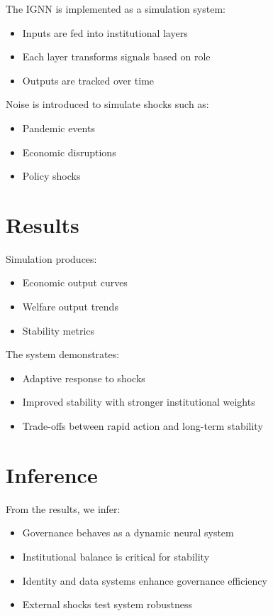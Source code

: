 \documentclass[12pt]{article}
\begin{document}
The IGNN is implemented as a simulation system:

\begin{itemize}
\item Inputs are fed into institutional layers
\item Each layer transforms signals based on role
\item Outputs are tracked over time
\end{itemize}

Noise is introduced to simulate shocks such as:

\begin{itemize}
\item Pandemic events
\item Economic disruptions
\item Policy shocks
\end{itemize}

\section{Results}

Simulation produces:

\begin{itemize}
\item Economic output curves
\item Welfare output trends
\item Stability metrics
\end{itemize}

The system demonstrates:

\begin{itemize}
\item Adaptive response to shocks
\item Improved stability with stronger institutional weights
\item Trade-offs between rapid action and long-term stability
\end{itemize}

\section{Inference}

From the results, we infer:

\begin{itemize}
\item Governance behaves as a dynamic neural system
\item Institutional balance is critical for stability
\item Identity and data systems enhance governance efficiency
\item External shocks test system robustness
\end{itemize}
\end{document}
